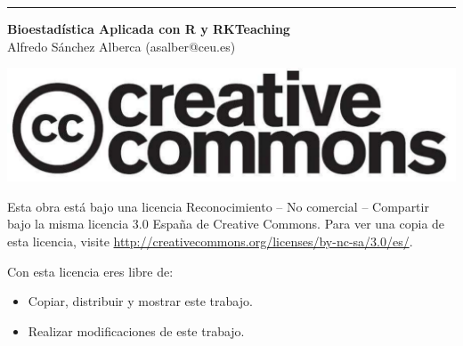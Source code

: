 \thispagestyle{empty}
\null
\vfill
\hrule depth 3pt
\smallskip
\sffamily

\noindent \textbf{Bioestadística Aplicada con R y RKTeaching}\\
Alfredo Sánchez Alberca (asalber@ceu.es) 

\bigskip
\begin{center}
\includegraphics[scale=0.1]{img/cc-logo}
\end{center}

\medskip

\small
Esta obra está bajo una licencia Reconocimiento -- No comercial -- Compartir bajo la misma licencia 3.0 España de Creative Commons.
Para ver una copia de esta licencia, visite \url{http://creativecommons.org/licenses/by-nc-sa/3.0/es/}.

\medskip
Con esta licencia eres libre de:
\begin{itemize}
\item Copiar, distribuir y mostrar este trabajo.
\item Realizar modificaciones de este trabajo.
\end{itemize}

